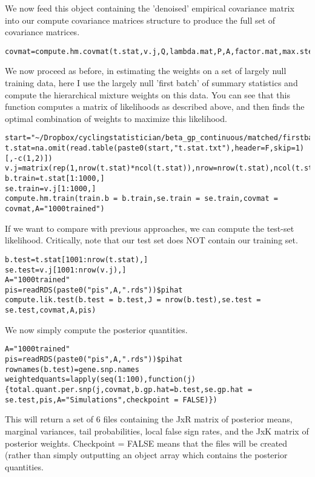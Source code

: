 \documentclass[10pt]{article}
\begin{document}
We now feed this object containing the 'denoised' empirical covariance matrix into our compute covariance matrices structure to produce the full set of covariance matrices.

\begin{verbatim}
covmat=compute.hm.covmat(t.stat,v.j,Q,lambda.mat,P,A,factor.mat,max.step=s)
\end{verbatim}    

We now proceed as before, in estimating the weights on a set of largely null training data, here I use the largely null 'first batch' of summary statistics and compute the hierarchical mixture weights on this data. You can see that this function computes a matrix of likelihoods as described above, and then finds the optimal combination of weights to maximize this likelihood.


\begin{verbatim}
start="~/Dropbox/cyclingstatistician/beta_gp_continuous/matched/firstbatch"
t.stat=na.omit(read.table(paste0(start,"t.stat.txt"),header=F,skip=1)[,-c(1,2)])
v.j=matrix(rep(1,nrow(t.stat)*ncol(t.stat)),nrow=nrow(t.stat),ncol(t.stat))
b.train=t.stat[1:1000,]
se.train=v.j[1:1000,]
compute.hm.train(train.b = b.train,se.train = se.train,covmat = covmat,A="1000trained")
\end{verbatim}   


If we want to compare with previous approaches, we can compute the test-set likelihood. Critically, note that our test set does NOT contain our training set.

\begin{verbatim}
b.test=t.stat[1001:nrow(t.stat),]
se.test=v.j[1001:nrow(v.j),]
A="1000trained"
pis=readRDS(paste0("pis",A,".rds"))$pihat
compute.lik.test(b.test = b.test,J = nrow(b.test),se.test = se.test,covmat,A,pis)
\end{verbatim}  

We now simply compute the posterior quantities. 

\begin{verbatim}
A="1000trained"
pis=readRDS(paste0("pis",A,".rds"))$pihat
rownames(b.test)=gene.snp.names
weightedquants=lapply(seq(1:100),function(j){total.quant.per.snp(j,covmat,b.gp.hat=b.test,se.gp.hat = se.test,pis,A="Simulations",checkpoint = FALSE)})
\end{verbatim}

This will return a set of 6 files containing the JxR matrix of posterior means, marginal variances, tail probabilities, local false sign rates, and the JxK matrix of posterior weights. Checkpoint = FALSE means that the files will be created (rather than simply outputting an object array which contains the posterior quantities.
\end{document}
